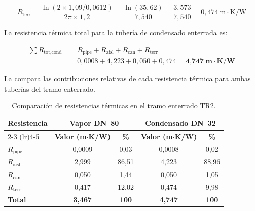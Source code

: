 \documentclass[12pt]{article}
\begin{document}
\begin{equation}
	R_{\text{terr}} = \frac{\ln(2 \times 1{,}09 / 0{,}0612)}{2\pi \times 1{,}2} = \frac{\ln(35{,}62)}{7{,}540} = \frac{3{,}573}{7{,}540} = 0{,}474~\text{m}\cdot\text{K/W}
	\label{eq:resist_terr_TR2_cond}
\end{equation}

La resistencia térmica total para la tubería de condensado enterrada es:

\begin{equation}
	\begin{split}
		\sum R_{\text{tot,cond}} & = R_{\text{pipe}} + R_{\text{aisl}} + R_{\text{can}} + R_{\text{terr}}                  \\
		                         & = 0{,}0008 + 4{,}223 + 0{,}050 + 0{,}474 = \textbf{4{,}747}~\textbf{m}\cdot\textbf{K/W}
	\end{split}
	\label{eq:resist_total_TR2_cond}
\end{equation}

La  compara las contribuciones relativas de cada resistencia térmica para ambas tuberías del tramo enterrado.

\begin{table}[htbp]
	\centering
	\caption{Comparación de resistencias térmicas en el tramo enterrado TR2.}
	\label{tab:resistencias_TR2}
	\begin{tabular}{lcccc}
		\toprule
		\textbf{Resistencia} & \multicolumn{2}{c}{\textbf{Vapor DN~80}} & \multicolumn{2}{c}{\textbf{Condensado DN~32}}                                               \\
		\cmidrule(lr){2-3} \cmidrule(lr){4-5}
		                     & \textbf{Valor (m$\cdot$K/W)}             & \textbf{\%}                                   & \textbf{Valor (m$\cdot$K/W)} & \textbf{\%}  \\
		\midrule
		$R_{\text{pipe}}$    & 0{,}0009                                 & 0{,}03                                        & 0{,}0008                     & 0{,}02       \\
		$R_{\text{aisl}}$    & 2{,}999                                  & 86{,}51                                       & 4{,}223                      & 88{,}96      \\
		$R_{\text{can}}$     & 0{,}050                                  & 1{,}44                                        & 0{,}050                      & 1{,}05       \\
		$R_{\text{terr}}$    & 0{,}417                                  & 12{,}02                                       & 0{,}474                      & 9{,}98       \\
		\midrule
		\textbf{Total}       & \textbf{3{,}467}                         & \textbf{100}                                  & \textbf{4{,}747}             & \textbf{100} \\
		\bottomrule
	\end{tabular}
\end{table}
\end{document}
